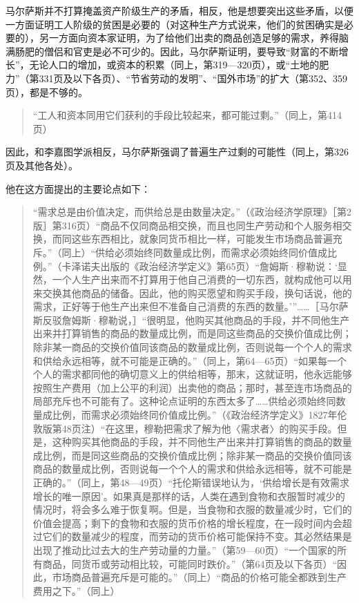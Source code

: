 马尔萨斯并不打算掩盖资产阶级生产的矛盾，相反，他是想要突出这些矛盾，以便一方面证明工人阶级的贫困是必要的（对这种生产方式说来，他们的贫困确实是必要的），另一方面向资本家证明，为了给他们出卖的商品创造足够的需求，养得脑满肠肥的僧侣和官吏是必不可少的。因此，马尔萨斯证明，要导致“财富的不断增长”，无论人口的增加，或资本的积累（同上，第319—320页），或“土地的肥力”（第331页及以下各页）、“节省劳动的发明”、“国外市场”的扩大（第352、359页），都是不够的。

\begin{quote}{“工人和资本同用它们获利的手段比较起来，都可能过剩。”（同上，第414页）}\end{quote}

因此，和李嘉图学派相反，马尔萨斯强调了普遍生产过剩的可能性（同上，第326页及其他各处）。

他在这方面提出的主要论点如下：

\begin{quote}{“需求总是由价值决定，而供给总是由数量决定。”（《政治经济学原理》［第2版］第316页）“商品不仅同商品相交换，而且也同生产劳动和个人服务相交换，而同这些东西相比，就象同货币相比一样，可能发生市场商品普遍充斥。”（同上）“供给必须始终同数量成比例，而需求必须始终同价值成比例。”（卡泽诺夫出版的《政治经济学定义》第65页）“詹姆斯·穆勒说：‘显然，一个人生产出来而不打算用于他自己消费的一切东西，就构成他可以用来交换其他商品的储备。因此，他的购买愿望和购买手段，换句话说，他的需求，正好等于他生产出来但不准备自己消费的东西的数量。’”……［马尔萨斯反驳詹姆斯·穆勒说，］“很明显，他购买其他商品的手段，并不同他生产出来并打算销售的商品的数量成比例，而是同这些商品的交换价值成比例；除非某一商品的交换价值同该商品的数量成比例，否则说每一个个人的需求和供给永远相等，就不可能是正确的。”（同上，第64—65页）“如果每一个个人的需求都同他的确切意义上的供给相等，那末，这就证明，他永远能够按照生产费用（加上公平的利润）出卖他的商品；那时，甚至连市场商品的局部充斥也不可能有了。这种论点证明的东西太多了……供给必须始终同数量成比例，而需求必须始终同价值成比例。”（《政治经济学定义》1827年伦敦版第48页注）“在这里，穆勒把需求了解为他〈需求者〉的购买手段。但是，这种购买其他商品的手段，并不同他生产出来并打算销售的商品的数量成比例，而是同这些商品的交换价值成比例；除非某一商品的交换价值同该商品的数量成比例，否则说每一个个人的需求和供给永远相等，就不可能是正确的。”（同上，第48—49页）“托伦斯错误地认为，‘供给增长是有效需求增长的唯一原因’。如果真是那样的话，人类在遇到食物和衣服暂时减少的情况时，将会多么难于恢复啊。但是，当食物和衣服的数量减少时，它们的价值会提高；剩下的食物和衣服的货币价格的增长程度，在一段时间内会超过它们的数量减少的程度，而劳动的货币价格可能保持不变。其必然结果是出现了推动比过去大的生产劳动量的力量。”（第59—60页）“一个国家的所有商品，同货币或劳动相比较，可能同时跌价。”（第64页及以下各页）“因此，市场商品普遍充斥是可能的。”（同上）“商品的价格可能全都跌到生产费用之下。”（同上）}\end{quote}

